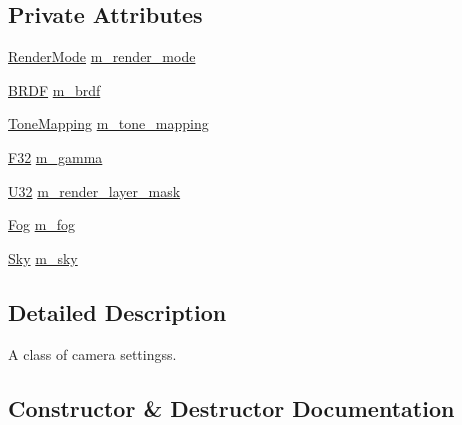 \subsection*{Private Attributes}
\begin{DoxyCompactItemize}
\item 
\hyperlink{namespacemage_1_1rendering_aeb14ce7610cc9391f4e01be027b91dcc}{Render\+Mode} \hyperlink{classmage_1_1rendering_1_1_camera_settings_adf563f8bd1ee5cecd126c6b4731de6e5}{m\+\_\+render\+\_\+mode}
\item 
\hyperlink{namespacemage_1_1rendering_ab8fe8684ca4bd74ba3a394b00cf125b5}{B\+R\+DF} \hyperlink{classmage_1_1rendering_1_1_camera_settings_a18daf9b9c8c7319e7db996a406aa0a43}{m\+\_\+brdf}
\item 
\hyperlink{namespacemage_1_1rendering_a789e4b7d9a8cc831b065e9c6bb7430e9}{Tone\+Mapping} \hyperlink{classmage_1_1rendering_1_1_camera_settings_a5a88df673aa475c5087bf74620048580}{m\+\_\+tone\+\_\+mapping}
\item 
\hyperlink{namespacemage_aa97e833b45f06d60a0a9c4fc22ae02c0}{F32} \hyperlink{classmage_1_1rendering_1_1_camera_settings_aec2e610b98b3657f49944a59c4717bee}{m\+\_\+gamma}
\item 
\hyperlink{namespacemage_a41c104c036fba3756a74e19f793eeaa1}{U32} \hyperlink{classmage_1_1rendering_1_1_camera_settings_ab6d4995fe7531563c5c5c8db1a0a1c9f}{m\+\_\+render\+\_\+layer\+\_\+mask}
\item 
\hyperlink{classmage_1_1rendering_1_1_fog}{Fog} \hyperlink{classmage_1_1rendering_1_1_camera_settings_a173329d1022c717efe29e33eaa554d18}{m\+\_\+fog}
\item 
\hyperlink{classmage_1_1rendering_1_1_sky}{Sky} \hyperlink{classmage_1_1rendering_1_1_camera_settings_a62c726791db2c8ee20ef404e15c5f26c}{m\+\_\+sky}
\end{DoxyCompactItemize}


\subsection{Detailed Description}
A class of camera settingss. 

\subsection{Constructor \& Destructor Documentation}
\hypertarget{classmage_1_1rendering_1_1_camera_settings_a46be4ca54bacf2597672a2e944f9fef6}{}\label{classmage_1_1rendering_1_1_camera_settings_a46be4ca54bacf2597672a2e944f9fef6} 
